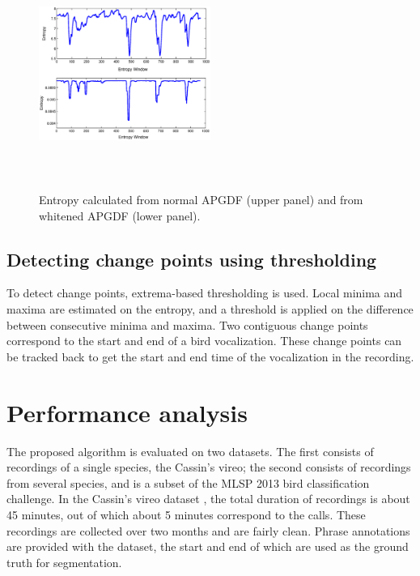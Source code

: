\documentclass[a4paper]{article}
\begin{document}
\begin{figure}[h]
\centering
\includegraphics[width=0.5\textwidth,height=7.5cm]{Entropy_gd_white_non_white.eps}
\caption{ Entropy calculated from normal APGDF (upper panel) and from whitened
APGDF (lower panel).}
\label{fig:entropy}
\end{figure}



\subsection{Detecting change points using thresholding}
To detect change points, extrema-based thresholding is used. Local minima and
maxima are estimated on the entropy, and a threshold is applied on the
difference between consecutive minima and maxima. Two contiguous change points
correspond to the start and end of a bird vocalization. These change points can
be tracked back to get the start and end time of the vocalization in the
recording.     
   
\section{Performance analysis}
\label{sec:eval}

The proposed algorithm is evaluated on two datasets. The first consists of
recordings of a single species, the Cassin's vireo; the second consists of
recordings from several species, and is a subset of the MLSP 2013 bird
classification challenge.
In the Cassin's vireo dataset \cite{data1}, the total duration
of recordings is about 45 minutes, out of which about 5 minutes correspond to
the calls. These recordings are collected over two months and are fairly clean.
Phrase annotations are provided with the dataset, the start and end of which
are used as the ground truth for segmentation. 
\end{document}
